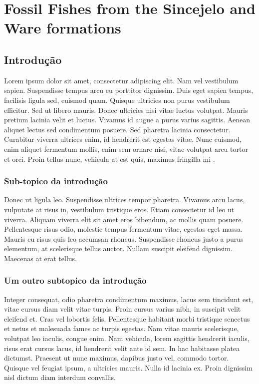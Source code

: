 \chapter{Fossil Fishes from the Sincejelo and Ware formations}
\label{chap:chapFossilFishes}

\section{Introdução}

Lorem ipsum dolor sit amet, consectetur adipiscing elit. Nam vel vestibulum sapien. Suspendisse tempus arcu eu porttitor dignissim. Duis eget sapien tempus, facilisis ligula sed, euismod quam. Quisque ultricies non purus vestibulum efficitur. Sed ut libero mauris. Donec ultricies nisi vitae luctus volutpat. Mauris pretium lacinia velit et luctus. Vivamus id augue a purus varius sagittis. Aenean aliquet lectus sed condimentum posuere. Sed pharetra lacinia consectetur. Curabitur viverra ultrices enim, id hendrerit est egestas vitae. Nunc euismod, enim aliquet fermentum mollis, enim sem ornare nisi, vitae volutpat arcu tortor et orci. Proin tellus nunc, vehicula at est quis, maximus fringilla mi \citep{Nascimento2005,Nascimento2006}.

\subsection{Sub-topico da introdução}

Donec ut ligula leo. Suspendisse ultrices tempor pharetra. Vivamus arcu lacus, vulputate at risus in, vestibulum tristique eros. Etiam consectetur id leo ut viverra. Aliquam viverra elit sit amet eros bibendum, ac mollis quam posuere. Pellentesque risus odio, molestie tempus fermentum vitae, egestas eget massa. Mauris eu risus quis leo accumsan rhoncus. Suspendisse rhoncus justo a purus elementum, at scelerisque tellus auctor. Nullam suscipit eleifend dignissim. Maecenas at erat tellus.

\subsection{Um outro subtopico da introdução}

Integer consequat, odio pharetra condimentum maximus, lacus sem tincidunt est, vitae cursus diam velit vitae turpis. Proin cursus varius nibh, in suscipit velit eleifend et. Cras vel lobortis felis. Pellentesque habitant morbi tristique senectus et netus et malesuada fames ac turpis egestas. Nam vitae mauris scelerisque, volutpat leo iaculis, congue enim. Nam vehicula, lorem sagittis hendrerit iaculis, risus erat cursus lacus, id hendrerit velit ante id sem. In hac habitasse platea dictumst. Praesent ut nunc maximus, dapibus justo vel, commodo tortor. Quisque vel feugiat ipsum, a ultricies mauris. Nulla id lacinia ex. Proin dignissim nisl dictum diam interdum convallis.


